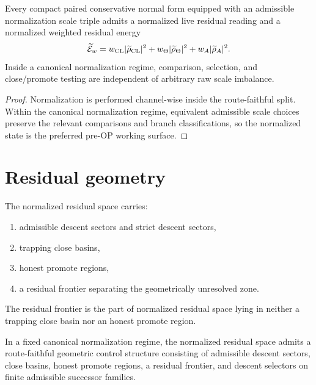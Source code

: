\begin{theorem}\label{thm:normalization-theorem}
Every compact paired conservative normal form equipped with an admissible normalization scale triple admits a normalized live residual reading and a normalized weighted residual energy
\[
\widetilde{\mathcal{E}}_{w}=w_{\mathrm{CL}}|\widetilde{\rho}_{\mathrm{CL}}|^2+w_{\Theta}|\widetilde{\rho}_{\Theta}|^2+w_A|\widetilde{\rho}_{A}|^2.
\]
Inside a canonical normalization regime, comparison, selection, and close/promote testing are independent of arbitrary raw scale imbalance.
\end{theorem}

\begin{proof}
Normalization is performed channel-wise inside the route-faithful split. Within the canonical normalization regime, equivalent admissible scale choices preserve the relevant comparisons and branch classifications, so the normalized state is the preferred pre-OP working surface.
\end{proof}

\section{Residual geometry}
\begin{definition}\label{def:normalized-residual-geometry}
The normalized residual space carries:
\begin{enumerate}[leftmargin=2em]
 \item admissible descent sectors and strict descent sectors,
 \item trapping close basins,
 \item honest promote regions,
 \item a residual frontier separating the geometrically unresolved zone.
\end{enumerate}
\end{definition}

\begin{definition}\label{def:residual-frontier}
The residual frontier is the part of normalized residual space lying in neither a trapping close basin nor an honest promote region.
\end{definition}

\begin{theorem}\label{thm:geometric-control}
In a fixed canonical normalization regime, the normalized residual space admits a route-faithful geometric control structure consisting of admissible descent sectors, close basins, honest promote regions, a residual frontier, and descent selectors on finite admissible successor families.
\end{theorem}

